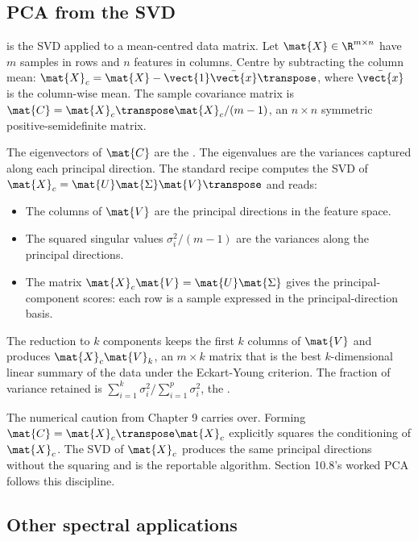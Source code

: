 \subsection{PCA from the SVD}

 is the SVD applied to a
mean-centred data matrix. Let $\mat{X} \in \R^{m \times n}$ have
$m$ samples in rows and $n$ features in columns. Centre by
subtracting the column mean: $\mat{X}_{c} = \mat{X} - \vect{1}
\bar{\vect{x}}\transpose$, where $\bar{\vect{x}}$ is the column-wise
mean. The sample covariance matrix is $\mat{C} = \mat{X}_{c}\transpose
\mat{X}_{c}/(m-1)$, an $n \times n$ symmetric positive-semidefinite
matrix.

The eigenvectors of $\mat{C}$ are the .
The eigenvalues are the variances captured along each principal
direction. The standard recipe computes the SVD of $\mat{X}_{c} =
\mat{U} \mat{\Sigma} \mat{V}\transpose$ and reads:

\begin{itemize}[leftmargin=*]
  \item The columns of $\mat{V}$ are the principal directions in the
    feature space.
  \item The squared singular values $\sigma_{i}^{2}/(m-1)$ are the
    variances along the principal directions.
  \item The matrix $\mat{X}_{c} \mat{V} = \mat{U} \mat{\Sigma}$
    gives the principal-component scores: each row is a sample
    expressed in the principal-direction basis.
\end{itemize}

The reduction to $k$ components keeps the first $k$ columns of
$\mat{V}$ and produces $\mat{X}_{c} \mat{V}_{k}$, an $m \times k$
matrix that is the best $k$-dimensional linear summary of the data
under the Eckart-Young criterion. The fraction of variance retained
is $\sum_{i=1}^{k} \sigma_{i}^{2} / \sum_{i=1}^{p} \sigma_{i}^{2}$,
the .

The numerical caution from Chapter 9 carries over. Forming $\mat{C} =
\mat{X}_{c}\transpose \mat{X}_{c}$ explicitly squares the conditioning
of $\mat{X}_{c}$. The SVD of $\mat{X}_{c}$ produces the same
principal directions without the squaring and is the reportable
algorithm. Section 10.8's worked PCA follows this discipline.

\subsection{Other spectral applications}

